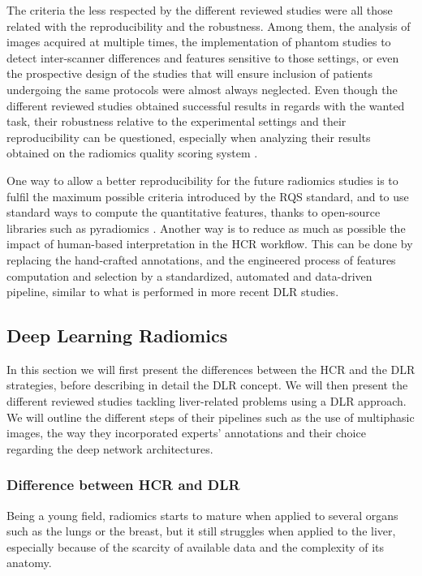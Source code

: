 \documentclass[]{article}
\begin{document}
The criteria the less respected by the different reviewed studies were
all those related with the reproducibility and the robustness. Among
them, the analysis of images acquired at multiple times, the
implementation of phantom studies to detect inter-scanner differences
and features sensitive to those settings, or even the prospective design
of the studies that will ensure inclusion of patients undergoing the
same protocols were almost always neglected.
Even though the different reviewed studies obtained successful results
in regards with the wanted task, their robustness relative to the
experimental settings and their reproducibility can be questioned,
especially when analyzing their results obtained on the radiomics
quality scoring system \cite{Lambin2017}.

One way to allow a better reproducibility for the future radiomics
studies is to fulfil the maximum possible criteria introduced by the
RQS standard, and to use standard ways to compute the
quantitative features, thanks to open-source libraries such as
pyradiomics \cite{VanGriethuysen2017}. Another way is to reduce as much
as possible the impact of human-based interpretation in the HCR
workflow. This can be done by replacing the hand-crafted annotations,
and the engineered process of features computation and selection by a
standardized, automated and data-driven pipeline, similar to what is
performed in more recent DLR studies.

\subsection{Deep Learning Radiomics}\label{deep-learning-radiomics}

In this section we will first present the differences between the
HCR and the DLR strategies, before describing in detail
the DLR concept. We will then present the different reviewed
studies tackling liver-related problems using a DLR approach. We
will outline the different steps of their pipelines such as the use of
multiphasic images, the way they incorporated experts' annotations and
their choice regarding the deep network architectures.

\subsubsection{Difference between HCR and
DLR}\label{difference-between-hcr-and-dlr}

Being a young field, radiomics starts to mature when applied to several
organs such as the lungs or the breast, but it still struggles when
applied to the liver, especially because of the scarcity of available
data and the complexity of its anatomy.
\end{document}
